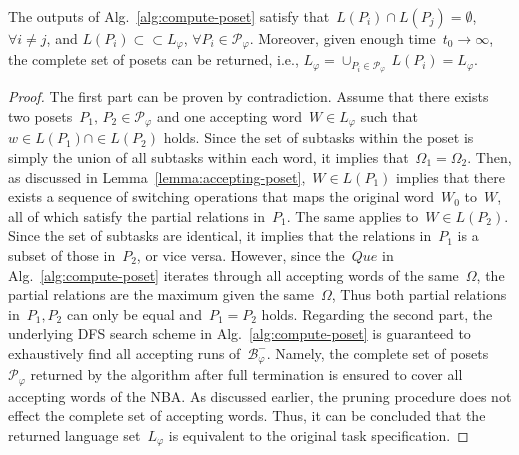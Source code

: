 \begin{lemma}\label{lemma:complete-poset}
The outputs of Alg.~\ref{alg:compute-poset}
satisfy that~$L(P_i)\cap L(P_j)=\emptyset$, $\forall i\neq j$,
and $L(P_i)\subset  \subset L_\varphi$, $\forall P_i \in \mathcal{P}_\varphi$.
Moreover, given enough time~$t_0\rightarrow \infty$,
the complete set of posets can be returned, i.e.,
$L_\varphi = \cup_{P_i\in \mathcal{P}_\varphi}\,L(P_i)=L_\varphi$.
\end{lemma}
\begin{proof}
The first part can be proven by contradiction.
 Assume that there exists two posets~$P_1,\,P_2\in \mathcal{P}_\varphi$
 and one accepting word~$W\in L_\varphi$ such that~$w\in L(P_1) \cap \in L(P_2)$ holds.
Since the set of subtasks within the poset is simply
 the union of all subtasks within each word,
 it implies that~$\Omega_1 = \Omega_2$.
 Then, as discussed in Lemma~\ref{lemma:accepting-poset},~$W\in L(P_1)$ implies
 that there exists a sequence of switching operations that maps the original
 word~$W_0$ to~$W$, all of which satisfy the partial relations in~$P_1$.
 The same applies to~$W\in L(P_2)$.
 Since the set of subtasks are identical, it implies that the relations in~$P_1$
 is a subset of those in~$P_2$, or vice versa.
 However, since the~$Que$ in Alg.~\ref{alg:compute-poset} iterates through all
 accepting words of the same~$\Omega$,
 the partial relations are the maximum given the same~$\Omega$,
 Thus both partial relations in~$P_1, P_2$ can only be equal and~$P_1=P_2$ holds.
Regarding the second part,
the underlying DFS search scheme in Alg.~\ref{alg:compute-poset} is guaranteed
 to exhaustively find all accepting runs of~$\mathcal{B}^-_{\varphi}$.
 Namely, the complete set of posets~$\mathcal{P}_{\varphi}$ returned
 by the algorithm after full termination is ensured to cover all
 accepting words of the NBA.
 As discussed earlier, the pruning procedure does not effect
 the complete set of accepting words.
 Thus, it can be concluded that the returned language set~$L_\varphi$
 is equivalent to the original task specification.
\end{proof}

